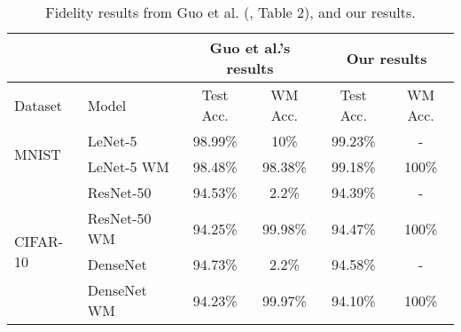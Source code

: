 \begin{table}
\small
\centering
\caption{Fidelity results from Guo et al. (\cite{guo_watermarking_2018}, Table 2), and our results.}
\label{tab:results-fidelity:embedded:compared}

\begin{tabular}{ll|cccc|}
\cline{3-6}
                                                &              & \multicolumn{2}{c|}{Guo et al.'s results}                           & \multicolumn{2}{c|}{Our results}         \\ \hline
\multicolumn{1}{|l|}{Dataset}                   & Model        & \multicolumn{1}{c|}{Test Acc.} & \multicolumn{1}{c|}{WM Acc.} & \multicolumn{1}{c|}{Test Acc.} & WM Acc. \\ \hline
\multicolumn{1}{|l|}{\multirow{2}{*}{MNIST}}    & LeNet-5      & 98.99\%                        & 10\%                         & 99.23\%                        & -       \\
\multicolumn{1}{|l|}{}                          & LeNet-5 WM   & 98.48\%                        & 98.38\%                      & 99.18\%                        & {\color[HTML]{036400} 100\%}   \\ \hline
\multicolumn{1}{|l|}{\multirow{4}{*}{CIFAR-10}} & ResNet-50    & 94.53\%                        & 2.2\%                        & 94.39\%                        & -       \\
\multicolumn{1}{|l|}{}                          & ResNet-50 WM & 94.25\%                        & 99.98\%                      & {\color[HTML]{036400} 94.47\% }                       & {\color[HTML]{036400} 100\%}  \\ \cline{2-6} 
\multicolumn{1}{|l|}{}                          & DenseNet     & 94.73\%                        & 2.2\%                        & 94.58\%                        & -       \\
\multicolumn{1}{|l|}{}                          & DenseNet WM  & 94.23\%                        & 99.97\%                      & 94.10\%                        & {\color[HTML]{036400} 100\%}   \\ \hline
\end{tabular}

\end{table}